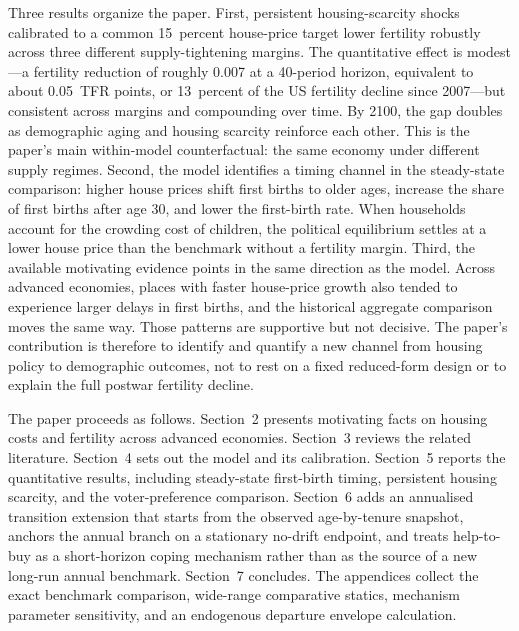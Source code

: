 \documentclass[11pt]{article}
\begin{document}
Three results organize the paper. First, persistent housing-scarcity shocks calibrated to a
common 15~percent house-price target lower fertility robustly across three different
supply-tightening margins. The quantitative effect is modest---a fertility reduction of
roughly 0.007 at a 40-period horizon, equivalent to about 0.05~TFR points, or 13~percent
of the US fertility decline since 2007---but consistent across margins and compounding over
time. By 2100, the gap doubles as demographic aging and housing scarcity reinforce each
other. This is the paper's main within-model counterfactual: the same economy under different
supply regimes. Second, the model identifies a timing channel in the steady-state comparison:
higher house prices shift first births to older ages, increase the share of first births after
age 30, and lower the first-birth rate. When households account for the crowding cost of
children, the political equilibrium settles at a lower house price than the benchmark without
a fertility margin. Third, the available motivating evidence points in the same direction as
the model. Across advanced economies, places with faster house-price growth also tended to
experience larger delays in first births, and the historical aggregate comparison moves the
same way. Those patterns are supportive but not decisive. The paper's contribution is
therefore to identify and quantify a new channel from housing policy to demographic outcomes,
not to rest on a fixed reduced-form design or to explain the full postwar fertility decline.

The paper proceeds as follows. Section~2 presents motivating facts on housing costs and
fertility across advanced economies. Section~3 reviews the related literature. Section~4 sets
out the model and its calibration. Section~5 reports the quantitative results, including
steady-state first-birth timing, persistent housing scarcity, and the voter-preference
comparison. Section~6 adds an annualised transition extension that starts from the observed
age-by-tenure snapshot, anchors the annual branch on a stationary no-drift endpoint, and
treats help-to-buy as a short-horizon coping mechanism rather than as the source of a new
long-run annual benchmark. Section~7 concludes. The appendices collect the exact benchmark comparison,
wide-range comparative statics, mechanism parameter sensitivity, and an endogenous departure
envelope calculation.






\end{document}
